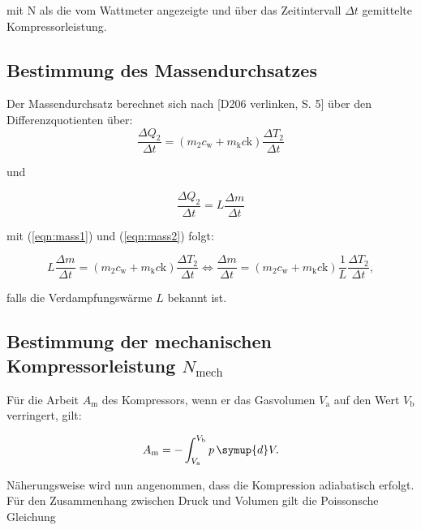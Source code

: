         mit N als die vom Wattmeter angezeigte und über das Zeitintervall $\Delta t$ gemittelte Kompressorleistung.


        \subsection{Bestimmung des Massendurchsatzes}

        Der Massendurchsatz berechnet sich nach [D206 verlinken, S. 5] über den Differenzquotienten über:
        \begin{equation}
            \frac{\Delta Q_2}{\Delta t} = \left( m_2  c_\text{w} + m_\text{k} c\text{k}\right) \frac{\Delta T_2}{\Delta t}
            \label{eqn:mass1}
        \end{equation}

        und 

        \begin{equation}
            \frac{\Delta Q_2}{\Delta t} = L \frac{\Delta m}{\Delta t}
            \label{eqn:mass2}
        \end{equation}

        mit (\ref{eqn:mass1}) und (\ref{eqn:mass2}) folgt:

        \begin{equation}
            L \frac{\Delta m}{\Delta t} = \left( m_2  c_\text{w} + m_\text{k} c\text{k}\right) \frac{\Delta T_2}{\Delta t} \iff \frac{\Delta m}{\Delta t} = \left( m_2  c_\text{w} + m_\text{k} c\text{k}\right) \frac{1}{L} \frac{\Delta T_2}{\Delta t},
        \end{equation}
        
        falls die Verdampfungswärme $L$ bekannt ist.


        \subsection{Bestimmung der mechanischen Kompressorleistung $N_\text{mech}$}

        Für die Arbeit $A_\text{m}$ des Kompressors, wenn er das Gasvolumen $V_\text{a}$ auf den Wert $V_\text{b}$ verringert, gilt:

        \begin{equation}
            A_\text{m} = - \int_{V_\text{a}}^{V_\text{b}} p \, \symup{d}V.
        \end{equation}

Näherungsweise wird nun angenommen, dass die Kompression adiabatisch erfolgt.
Für den Zusammenhang zwischen Druck und Volumen gilt die Poissonsche Gleichung

